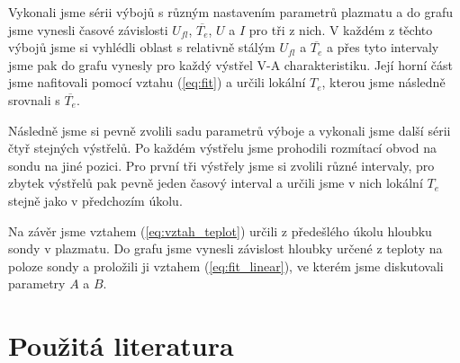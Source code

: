 \documentclass[english]{article}
\begin{document}
		Vykonali jsme sérii výbojů s různým nastavením parametrů plazmatu a do grafu jsme vynesli časové závislosti $U_{fl}$, $\overline{T_e}$,  $U$ a $I$ pro tři z nich. V každém z těchto výbojů jsme si vyhlédli oblast s relativně stálým $U_{fl}$ a $\overline{T_e}$ a přes tyto intervaly jsme pak do grafu vynesly pro každý výstřel V-A charakteristiku. Její horní část jsme nafitovali pomocí vztahu (\ref{eq:fit}) a určili lokální $T_e$, kterou jsme následně srovnali s $\overline{T_e}$. 
		
		Následně jsme si pevně zvolili sadu parametrů výboje a vykonali jsme další sérii čtyř stejných výstřelů. Po každém výstřelu jsme prohodili rozmítací obvod na sondu na jiné pozici. Pro první tři výstřely jsme si zvolili různé intervaly, pro zbytek výstřelů pak pevně jeden časový interval a určili jsme v nich lokální $T_e$ stejně jako v předchozím úkolu. 
		
		Na závěr jsme vztahem (\ref{eq:vztah_teplot}) určili z předešlého úkolu hloubku sondy v plazmatu. Do grafu jsme vynesli závislost hloubky určené z teploty na poloze sondy a proložili ji vztahem (\ref{eq:fit_linear}), ve kterém jsme diskutovali parametry $A$ a $B$.
	

\section {Použitá literatura}
\begingroup
\renewcommand{\section}[2]{}
\end{document}
